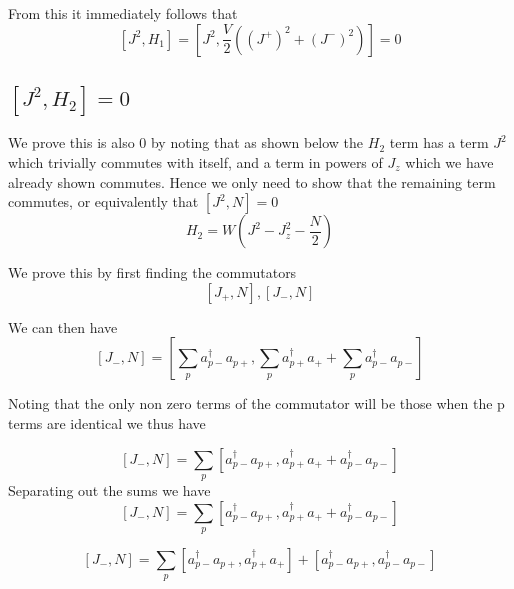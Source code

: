 \documentclass[11pt]{article} %
\begin{document}
From this it immediately follows that 
\begin{equation}
\left[J^2,H_1\right]=\left[J^2, \frac{V}{2}\left((J^+)^2+(J^-)^2\right)\right]=0
\end{equation}

\subsection{$\left[J^2,H_2\right]=0$}

We prove this is also 0 by noting that as shown below the $H_2$ term has a term $J^2$ which trivially commutes with itself, and a term in powers of $J_z$ which we have already shown commutes. Hence we only need to show that the remaining term commutes, or equivalently that $\left[J^2,N\right]=0$\\
\begin{equation}
H_2=W\left(J^2-J_z^2-\frac{N}{2}\right)
\end{equation}

We prove this by first finding the commutators\\

\begin{equation}
\left[J_+,N\right], \left[J_-,N\right]
\end{equation}

We can then have\\

\begin{equation}
\left[J_-,N\right]=\left[\sum_p a_{p-}^\dagger a_{p+}, \sum_p a_{p+}^\dagger a_+ +\sum_p a_{p-}^\dagger a_{p-}\right]
\end{equation}

Noting that the only non zero terms of the commutator will be those when the p terms are identical we thus have

\begin{equation}
\left[J_-,N\right]=\sum_p\left[ a_{p-}^\dagger a_{p+},  a_{p+}^\dagger a_+ + a_{p-}^\dagger a_{p-}\right]
\end{equation}
Separating out the sums we have
\begin{equation}
\left[J_-,N\right]=\sum_p\left[ a_{p-}^\dagger a_{p+},  a_{p+}^\dagger a_+ + a_{p-}^\dagger a_{p-}\right]
\end{equation}

\begin{equation}
\left[J_-,N\right]=\sum_p\left[ a_{p-}^\dagger a_{p+},  a_{p+}^\dagger a_+ \right]+\left[ a_{p-}^\dagger a_{p+},  a_{p-}^\dagger a_{p-}\right]
\end{equation}
\end{document}
